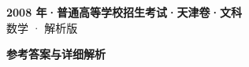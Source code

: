 \documentclass[zihao=-4, a4paper]{ctexart}
\begin{document}
\begin{center}
  {\Large\bfseries 2008 年·普通高等学校招生考试·天津卷·文科}\\[4pt]
  {\large 数学 · 解析版}
\end{center}
\medskip
{}

\clearpage
{}
\begin{center}{\Large\bfseries 参考答案与详细解析}\end{center}
\medskip

\end{document}
